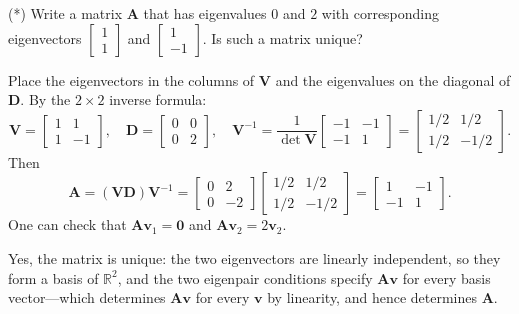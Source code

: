 \begin{exercise} %
    (*) Write a matrix $\mathbf{A}$ that has eigenvalues $0$ and $2$ with corresponding eigenvectors $\begin{bmatrix} 1 \\ 1 \end{bmatrix}$ and $\begin{bmatrix} 1 \\ -1 \end{bmatrix}$.
    Is such a matrix unique?
\end{exercise}

\begin{solution}
    Place the eigenvectors in the columns of $\mathbf{V}$ and the eigenvalues on the diagonal of $\mathbf{D}$. By the $2 \times 2$ inverse formula:
    \[
        \mathbf{V} = \begin{bmatrix} 1 & 1 \\ 1 & -1 \end{bmatrix}, \quad
        \mathbf{D} = \begin{bmatrix} 0 & 0 \\ 0 & 2 \end{bmatrix}, \quad
        \mathbf{V}^{-1} = \frac{1}{\det\mathbf{V}} \begin{bmatrix} -1 & -1 \\ -1 & 1 \end{bmatrix}
                        = \begin{bmatrix} 1/2 & 1/2 \\ 1/2 & -1/2 \end{bmatrix}.
    \]
    Then
    \[
        \mathbf{A} = (\mathbf{V}\mathbf{D})\mathbf{V}^{-1}
        = \begin{bmatrix} 0 & 2 \\ 0 & -2 \end{bmatrix}
          \begin{bmatrix} 1/2 & 1/2 \\ 1/2 & -1/2 \end{bmatrix}
        = \begin{bmatrix} 1 & -1 \\ -1 & 1 \end{bmatrix}.
    \]
    One can check that $\mathbf{A}\mathbf{v}_1 = \mathbf{0}$ and $\mathbf{A}\mathbf{v}_2 = 2\mathbf{v}_2$.

    Yes, the matrix is unique: the two eigenvectors are linearly independent, so they form a basis of $\mathbb{R}^2$, and the two eigenpair conditions specify $\mathbf{A}\mathbf{v}$ for every basis vector---which determines $\mathbf{A}\mathbf{v}$ for every $\mathbf{v}$ by linearity, and hence determines $\mathbf{A}$.
\end{solution}

